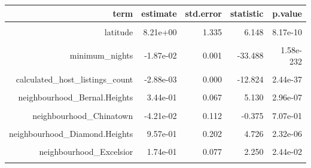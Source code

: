 \documentclass[justified, 11pt]{scrartcl}\usepackage[]{graphicx}\usepackage[]{xcolor}
\newenvironment{knitrout}{}{} %
\begin{document}
\begin{knitrout}
\begin{table}
\begin{tabular}{r|r|r|r|r}
\hline
term & estimate & std.error & statistic & p.value\\
\hline
\cellcolor{gray!6}{(Intercept)} & \cellcolor{gray!6}{2.14e+02} & \cellcolor{gray!6}{142.737} & \cellcolor{gray!6}{1.499} & \cellcolor{gray!6}{1.34e-01}\\
\hline
latitude & 8.21e+00 & 1.335 & 6.148 & 8.17e-10\\
\hline
\cellcolor{gray!6}{longitude} & \cellcolor{gray!6}{4.23e+00} & \cellcolor{gray!6}{1.013} & \cellcolor{gray!6}{4.181} & \cellcolor{gray!6}{2.93e-05}\\
\hline
minimum\_nights & -1.87e-02 & 0.001 & -33.488 & 1.58e-232\\
\hline
\cellcolor{gray!6}{number\_of\_reviews} & \cellcolor{gray!6}{-1.30e-03} & \cellcolor{gray!6}{0.000} & \cellcolor{gray!6}{-16.817} & \cellcolor{gray!6}{1.45e-62}\\
\hline
calculated\_host\_listings\_count & -2.88e-03 & 0.000 & -12.824 & 2.44e-37\\
\hline
\cellcolor{gray!6}{availability\_365} & \cellcolor{gray!6}{-2.64e-06} & \cellcolor{gray!6}{0.000} & \cellcolor{gray!6}{-0.050} & \cellcolor{gray!6}{9.60e-01}\\
\hline
neighbourhood\_Bernal.Heights & 3.44e-01 & 0.067 & 5.130 & 2.96e-07\\
\hline
\cellcolor{gray!6}{neighbourhood\_Castro.Upper.Market} & \cellcolor{gray!6}{5.52e-01} & \cellcolor{gray!6}{0.090} & \cellcolor{gray!6}{6.170} & \cellcolor{gray!6}{7.10e-10}\\
\hline
neighbourhood\_Chinatown & -4.21e-02 & 0.112 & -0.375 & 7.07e-01\\
\hline
\cellcolor{gray!6}{neighbourhood\_Crocker.Amazon} & \cellcolor{gray!6}{4.23e-01} & \cellcolor{gray!6}{0.107} & \cellcolor{gray!6}{3.948} & \cellcolor{gray!6}{7.95e-05}\\
\hline
neighbourhood\_Diamond.Heights & 9.57e-01 & 0.202 & 4.726 & 2.32e-06\\
\hline
\cellcolor{gray!6}{neighbourhood\_Downtown.Civic.Center} & \cellcolor{gray!6}{-9.57e-02} & \cellcolor{gray!6}{0.097} & \cellcolor{gray!6}{-0.984} & \cellcolor{gray!6}{3.25e-01}\\
\hline
neighbourhood\_Excelsior & 1.74e-01 & 0.077 & 2.250 & 2.44e-02\\
\hline
\cellcolor{gray!6}{neighbourhood\_Financial.District} & \cellcolor{gray!6}{2.87e-01} & \cellcolor{gray!6}{0.104} & \cellcolor{gray!6}{2.758} & \cellcolor{gray!6}{5.83e-03}\\

\end{tabular}
\end{table}
\end{knitrout}
\end{document}
